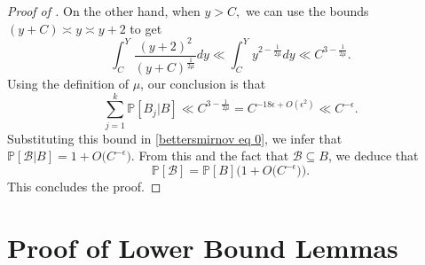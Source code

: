\documentclass{amsart}
\theoremstyle{definition}
\numberwithin{equation}{section}
\renewcommand{\P}{\mathbb{P}}
\begin{document}
\begin{proof}[Proof of ]
	On the other hand, when $y > C,$ we can use the bounds $(y+C) \asymp y \asymp y+2$  to get 
	$$ \int_{C}^{Y}\frac{(y+2)^{2}}{(y+C)^{\frac{1}{2\mu}}}dy \ll  \int_{C}^{Y}y^{2-\frac{1}{2\mu}}dy \ll C^{3-\frac{1}{2\mu}}.$$
	Using the definition of $\mu$, our conclusion is that 
	$$\sum_{j = 1}^k \P[B_j|B] \ll C^{3-\frac{1}{2\mu}} = C^{-18 \epsilon +O(\epsilon^2)} \ll C^{-\epsilon}.$$
	Substituting this bound in \eqref{bettersmirnov eq 0}, we infer that $\P[\mathscr{B} | B] = 1 + O\big(C^{-\epsilon}\big).$ From this and the fact that $\mathscr{B} \subseteq B$, we deduce that
	$$\P[\mathscr{B}] = \P[B]\big(1 + O\big(C^{-\epsilon}\big)\big).$$
	This concludes the proof.
\end{proof}
	
	\section{Proof of Lower Bound Lemmas}\label{sec lower bound proofs}
\end{document}
